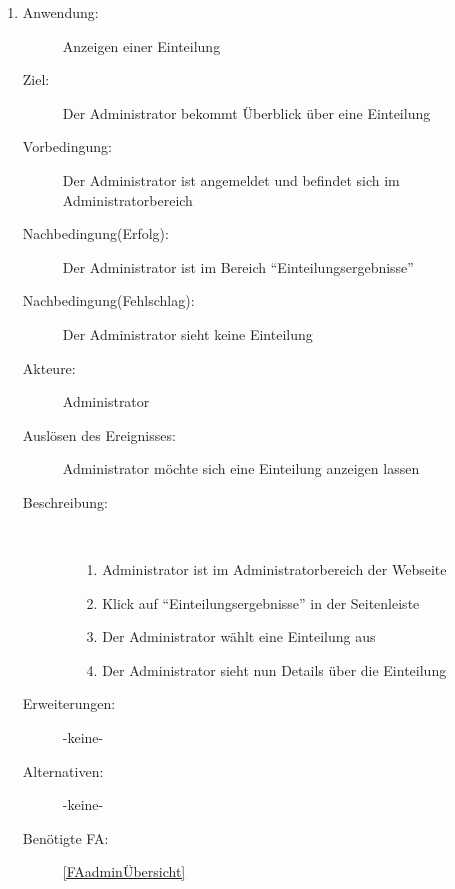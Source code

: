 \documentclass[parskip=full]{scrartcl}
\newcommand{\swtLabel}[1]{\textbf{/#1\arabic*0/}}
\begin{document}
\begin{enumerate} [label=\swtLabel{A}]
  \item \label{UCadminEinteilungUebersicht}
    \begin{description}
  	\item[Anwendung:] Anzeigen einer Einteilung
  	\item[Ziel:] Der Administrator bekommt Überblick über eine Einteilung
  	\item[Vorbedingung:] Der Administrator ist angemeldet und befindet sich im Administratorbereich
  	\item[Nachbedingung(Erfolg):] Der Administrator ist im Bereich
  	\enquote{Einteilungsergebnisse}
  	\item[Nachbedingung(Fehlschlag):] Der Administrator sieht keine Einteilung
  	\item[Akteure:] Administrator
  	\item[Auslösen des Ereignisses:] Administrator möchte sich eine Einteilung
  	anzeigen lassen
  	\item[Beschreibung:]~
  	\begin{enumerate}
  	  \item[1.] Administrator ist im Administratorbereich der Webseite
      \item[2.] Klick auf \enquote{Einteilungsergebnisse} in der Seitenleiste
      \item[3.] Der Administrator wählt eine Einteilung aus
      \item[4.] Der Administrator sieht nun Details über die Einteilung
  	\end{enumerate}
  	\item[Erweiterungen:] -keine-
  	\item[Alternativen:] -keine-
  	\item[Benötigte FA:] \ref{FAadminÜbersicht}
  \end{description}
  

\end{enumerate}
\end{document}
